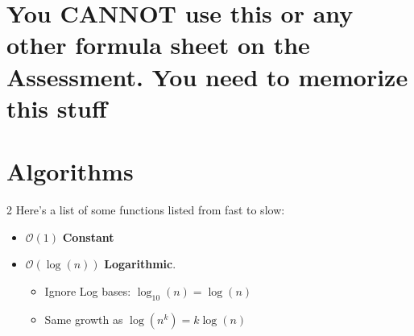 \documentclass{exam}
\begin{document}
            \small
\section*{ You \textbf{CANNOT} use this or any other formula sheet on the Assessment. You need to memorize this stuff }

\section*{Algorithms}
    \begin{multicols}{2}
        Here's a list of some functions listed from fast to slow:
        \begin{itemize}
            \item[] $\mathcal{O}(1)$ \textbf{Constant}
            \item[] $\mathcal{O}(\log(n))$ \textbf{Logarithmic}. 
            \begin{itemize}
                \item[] Ignore Log bases: $\log_{10}(n)=\log(n)$
                \item[] Same growth as $\log(n^{k})=k\log(n)$ 
            \end{itemize}
            

\end{itemize}
\end{multicols}
\end{document}
